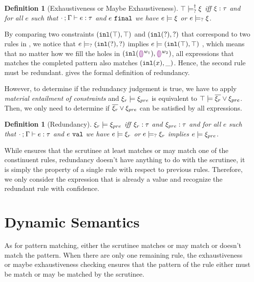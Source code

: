 \documentclass[acmsmall,screen,review,nonacm]{acmart}
\theoremstyle{slplain}
\numberwithin{thm}{section}
\newtheorem{defn}[thm]{Definition}
\begin{document}
\begin{defn}[Exhaustiveness or Maybe Exhaustiveness]
  \label{defn:exhaustiveness}
  $\top \models_{?}^{\dag} \xi$ iff $\xi : \tau$ and for all $e$ such that $\cdot \mathbin{;} \Gamma \vdash e : \tau$ and $e ~\mathtt{final}$ we have $e \models \xi$ or $e \models_{?} \xi$.
\end{defn}

By comparing two constraints $(\mathtt{inl}(\top) , \top)$ and $(\mathtt{inl}(\mathtt{?}) , \mathtt{?})$ that correspond to two rules in , we notice that
$e \models_{?} (\mathtt{inl}(\mathtt{?}) , \mathtt{?})$ implies $e \models (\mathtt{inl}(\top) , \top)$
, which means that no matter how we fill the holes in $(\mathtt{inl}(\textcolor{violet}{\llparenthesis}\textcolor{violet}{\rrparenthesis}^{w_1}) , \textcolor{violet}{\llparenthesis}\textcolor{violet}{\rrparenthesis}^{w_2})$, all expressions that matches the completed pattern also matches $(\mathtt{inl}(x) , \_)$. Hence, the second rule must be redundant.
 gives the formal definition of redundancy.

However, to determine if the redundancy judgement is true, we have to apply \emph{material entailment of constraints} and $\xi_r \models \xi_{pre}$ is equivalent to $\top \models \overline{\xi_r} \vee \xi_{pre}$. Then, we only need to determine if $\overline{\xi_r} \vee \xi_{pre}$ can be satisfied by all expressions.

\begin{defn}[Redundancy]
  \label{defn:redundancy}
  $\xi_r \models \xi_{pre}$ iff $\xi_r : \tau$ and $\xi_{pre} : \tau$ and for all $e$ such that $\cdot \mathbin{;} \Gamma \vdash e : \tau$ and $e ~\mathtt{val}$ we have $e \models \xi_r$ or $e \models_{?} \xi_r$ implies $e \models \xi_{pre}$.
\end{defn}

While  ensures that the scrutinee at least matches or may match one of the constinuent rules, redundancy doesn't have anything to do with the scrutinee, it is simply the property of a single rule with respect to previous rules. Therefore, we only consider the expression that is already a value and recognize the redundant rule with confidence.

\section{Dynamic Semantics}
\label{sec:dynamics}

As for pattern matching, either the scrutinee matches or may match or doesn't match the pattern.
When there are only one remaining rule, the exhaustiveness or maybe exhaustiveness checking ensures that the pattern of the rule either must be match or may be matched by the scrutinee.
\end{document}
